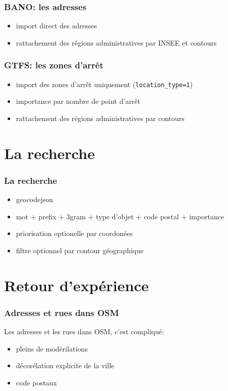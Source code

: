 \documentclass[table]{beamer}
\begin{document}
\begin{frame}
  \frametitle{BANO: les adresses}

  \begin{itemize}
  \item import direct des adresses
  \item rattachement des régions administratives par INSEE et contours
  \end{itemize}
\end{frame}

\begin{frame}
  \frametitle{GTFS: les zones d'arrêt}

  \begin{itemize}
  \item import des zones d'arrêt uniquement (\texttt{location\_type=1})
  \item importance par nombre de point d'arrêt
  \item rattachement des régions administratives par contours
  \end{itemize}
\end{frame}

\section{La recherche}

\begin{frame}
  \frametitle{La recherche}

  \begin{itemize}
  \item geocodejson
  \item mot + prefix + 3gram + type d'objet + code postal + importance
  \item priorisation optionelle par coordonées
  \item filtre optionnel par contour géographique
  \end{itemize}
\end{frame}

\section{Retour d'expérience}

\begin{frame}
  \frametitle{Adresses et rues dans OSM}

  Les adresses et les rues dans OSM, c'est compliqué:
  \begin{itemize}
  \item pleins de modérilations
  \item décorélation explicite de la ville
  \item code postaux
  \end{itemize}
\end{frame}
\end{document}
